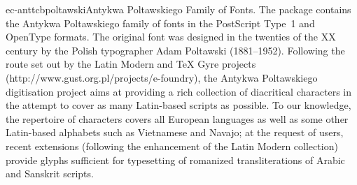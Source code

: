 \documentclass{ddltxtyp}
\begin{document}
\begin{package}{ec-anttcb}{poltawski}{Antykwa Poltawskiego Family of Fonts.}
The package contains the Antykwa Poltawskiego family of fonts
in the PostScript Type~1 and OpenType formats. The original
font was designed in the twenties of the XX century by the
Polish typographer Adam Poltawski (1881--1952). Following the
route set out by the Latin Modern and {\TeX} Gyre projects
(http://www.gust.org.pl/projects/e-foundry), the Antykwa
Poltawskiego digitisation project aims at providing a rich
collection of diacritical characters in the attempt to cover as
many Latin-based scripts as possible. To our knowledge, the
repertoire of characters covers all European languages as well
as some other Latin-based alphabets such as Vietnamese and
Navajo; at the request of users, recent extensions (following
the enhancement of the Latin Modern collection) provide glyphs
sufficient for typesetting of romanized transliterations of
Arabic and Sanskrit scripts. %
\end{package}
\end{document}
